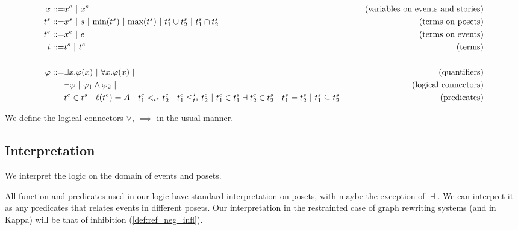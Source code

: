 \begin{align*}
  x ::= & x^e ~|~ x^s & \tag{variables on events and stories} \\
  t^s ::= & x^s ~|~ s ~|~ \text{min}(t^s) ~|~ \text{max}(t^s) ~|~ t^s_1 \cup t^s_2 ~|~ t^s_1 \cap t^s_2 &\tag{terms on posets} \\
  t^e ::= & x^e ~|~ e & \tag{terms on events}\\
  t ::= & t^s ~|~ t^e & \tag{terms}\\
  \\
  \varphi ::= & \exists x.\varphi(x) ~|~ \forall x.\varphi(x) ~|&\tag{quantifiers}\\
  & \neg \varphi ~|~\varphi_1 \wedge \varphi_2~|&\tag{logical connectors}\\
  & t^e\in t^s ~|~ \ell(t^e) = A ~|~ t^e_1 <_{t^s} t^e_2 ~|~ t^e_1 \leq^{\star}_{t^s} t^e_2 ~|~ t^e_1\in t^s_1 \dashv t^e_2\in t^s_2~|~ t^s_1 = t^s_2 ~|~ t^s_1\subseteq t^s_2
  & \tag{predicates}\\
\end{align*}

We define the logical connectors $\vee$, $\implies$ in the usual manner.

\subsection{Interpretation}

We interpret the logic on the domain of events and posets.

All function and predicates used in our logic have standard interpretation on posets, with maybe the exception of $\dashv$. We can interpret it as any predicates that relates events in different posets. Our interpretation in the restrainted case of graph rewriting systems (and in Kappa) will be that of inhibition (\autoref{def:ref_neg_infl}).

